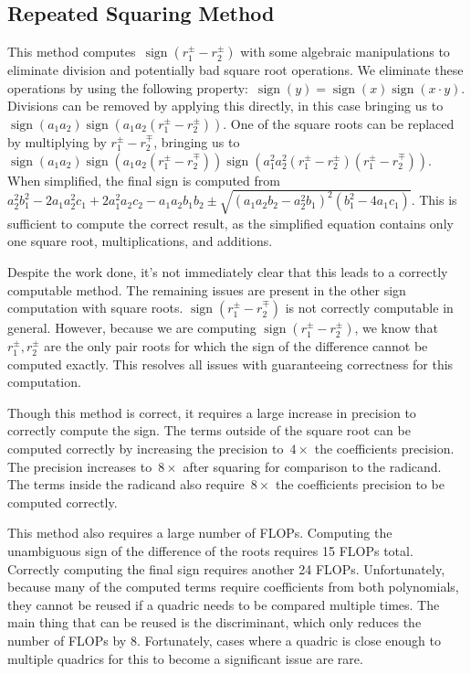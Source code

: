 \documentclass{cccg16}
\DeclareMathOperator{\sign}{sign}
\begin{document}
\subsection{Repeated Squaring Method}
This method computes~$\sign(r_1^\pm-r_2^\pm)$ with some algebraic
manipulations to eliminate division and potentially bad square root
operations.  We eliminate these operations by using the following
property:~$\sign(y)=\sign(x)\sign(x\cdot y)$.  Divisions can be
removed by applying this directly, in this case bringing us
to~$\sign(a_1 a_2)\sign(a_1 a_2 (r_1^\pm-r_2^\pm))$.  One of the
square roots can be replaced by multiplying by $r_1^\pm-r_2^\mp$,
bringing us to~$\sign(a_1 a_2)\sign(a_1 a_2
(r_1^\pm-r_2^\mp))\sign(a_1^2 a_2^2 (r_1^\pm - r_2^\pm) (r_1^\pm -
r_2^\mp))$.  When simplified, the final sign is computed
from~$a_2^2b_1^2-2a_1a_2^2c_1+2a_1^2a_2c_2-a_1a_2b_1b_2\pm
\sqrt{(a_1a_2b_2-a_2^2b_1)^2(b_1^2-4a_1c_1)}$. This is sufficient to
compute the correct result, as the simplified equation contains only
one square root, multiplications, and additions.

Despite the work done, it's not immediately clear that this leads to a
correctly computable method.  The remaining issues are present in the
other sign computation with square roots. $\sign(r_1^\pm-r_2^\mp)$ is
not correctly computable in general.  However, because we are
computing $\sign(r_1^\pm-r_2^\pm)$, we know that $r_1^\pm, r_2^\pm$
are the only pair roots for which the sign of the difference cannot be
computed exactly.  This resolves all issues with guaranteeing
correctness for this computation.

Though this method is correct, it requires a large increase in
precision to correctly compute the sign. The terms outside of the
square root can be computed correctly by increasing the precision
to~$4\times$ the coefficients precision.  The precision increases
to~$8\times$ after squaring for comparison to the radicand.  The terms
inside the radicand also require~$8\times$ the coefficients precision
to be computed correctly.

This method also requires a large number of FLOPs.  Computing the
unambiguous sign of the difference of the roots requires 15 FLOPs
total.  Correctly computing the final sign requires another 24 FLOPs.
Unfortunately, because many of the computed terms require coefficients
from both polynomials, they cannot be reused if a quadric needs to be
compared multiple times.  The main thing that can be reused is the
discriminant, which only reduces the number of FLOPs by 8.
Fortunately, cases where a quadric is close enough to multiple
quadrics for this to become a significant issue are rare.
\end{document}
